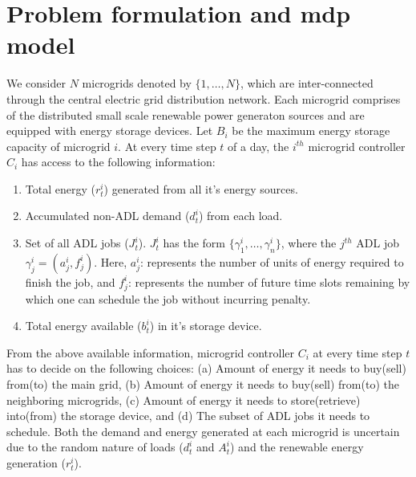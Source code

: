 \section{Problem formulation and mdp model} \label{sec:model}
We consider $N$ microgrids denoted by $\{1,\ldots,N\}$, which are inter-connected through the central electric grid distribution network. Each microgrid comprises of the distributed small scale renewable power generaton sources and are equipped with energy storage devices. Let $B_i$ be the maximum energy storage capacity of microgrid $i$. At every time step $t$ of a day, the $i^{th}$ microgrid controller $C_i$ has access to the following information:
\begin{enumerate}[label=(\alph*)]
\item Total energy ($r_t^i$) generated from all it's energy sources.
\item Accumulated non-ADL demand ($d_t^i$) from each load. 
\item Set of all ADL jobs ($J_{t}^{i}$). $J_{t}^{i}$ has the form $\{\gamma_{1}^{i},\ldots,\gamma_{n}^{i}\}$, where the $j^{th}$ ADL job $\gamma_{j}^{i} = (a_{j}^{i}, f_{j}^{i})$. Here, $a_{j}^{i}$: represents the number of units of energy required to finish the job, and  $f_{j}^{i}$: represents the number of future time slots remaining by which one can schedule the job without incurring penalty.
\item  Total energy available ($b_{t}^{i}$) in it's storage device.
\end{enumerate} 
From the above available information, microgrid controller  $C_i$ at every time step $t$ has to decide on the following choices: (a)  Amount of energy it needs to buy(sell) from(to) the main grid, (b) Amount of energy it needs to buy(sell) from(to) the neighboring microgrids,
(c) Amount of energy it needs to store(retrieve) into(from) the storage device, and (d) The subset of ADL jobs it needs to schedule. Both the demand and energy generated at each microgrid is uncertain due to the random nature of loads ($d_t^i$ and $A_t^i$) and the renewable energy generation ($r_t^i$). 

